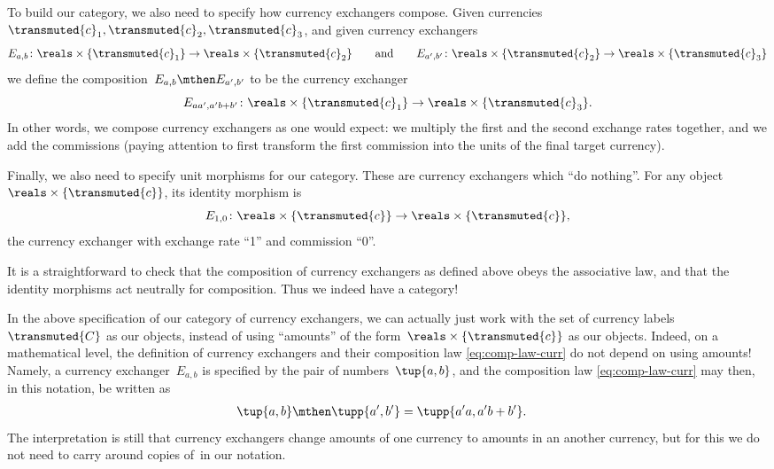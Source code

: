 To build our category, we also need to specify how currency exchangers compose. Given currencies~$\transmuted{c}_1, \transmuted{c}_2, \transmuted{c}_3$, and given currency exchangers
\begin{equation*}
  E_{a,b} \colon \reals \times \{\transmuted{c}_1 \} \to \reals \times \{ \transmuted{c}_2\}
  \qquad \text{and} \qquad
  E_{a',b'} \colon \reals \times \{\transmuted{c}_2\} \to \reals \times \{\transmuted{c}_3\}
\end{equation*}
we define the composition~$E_{a,b} \mthen E_{a',b'}$ to be the currency exchanger
\begin{equation}
  \label{eq:comp-law-curr}
  E_{aa',a'b + b'} \colon \reals \times \{\transmuted{c}_1\} \to \reals \times \{\transmuted{c}_3\}.
\end{equation}
In other words, we compose currency exchangers as one would expect: we multiply the first and the second exchange rates together, and we add the commissions (paying attention to first transform the first commission into the units of the final target currency).

Finally, we also need to specify unit morphisms for our category. These are currency exchangers which ``do nothing''. For any object~$\reals \times \{ \transmuted{c}\}$, its identity morphism is
\begin{equation*}
  E_{1,0} \colon \reals \times \{\transmuted{c}\} \to \reals \times \{\transmuted{c}\},
\end{equation*}
the currency exchanger with exchange rate ``1'' and commission ``0''.

It is a straightforward to check that the composition of currency exchangers as defined above obeys the associative law, and that the identity morphisms act neutrally for composition. Thus we indeed have a category!

\begin{remark}
  In the above specification of our category of currency exchangers, we can actually just work with the set of currency labels~$\transmuted{C}$ as our objects, instead of using ``amounts'' of the form~$\reals \times \{\transmuted{c}\}$ as our objects. Indeed, on a mathematical level, the definition of currency exchangers and their composition law \cref{eq:comp-law-curr} do not depend on using amounts! Namely, a currency exchanger~$E_{a,b}$ is specified by the pair of numbers~$\tup{a, b}$, and the composition law \cref{eq:comp-law-curr} may then, in this notation, be written as
  \begin{equation}
    \begin{aligned}
      \label{eq:currencycomp}
      \tup{a,b}\mthen \tupp{a',b'}&=\tupp{a' a, a' b + b'}.
    \end{aligned}
  \end{equation}
  The interpretation is still that currency exchangers change amounts of one currency to amounts in an another currency, but for this we do not need to carry around copies of~\reals in our notation.
\end{remark}

